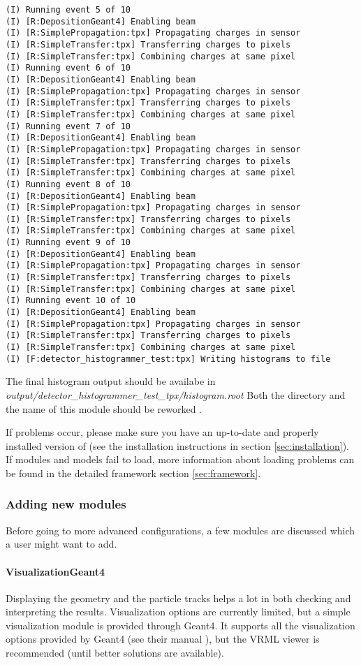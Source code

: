 \begin{lstlisting}[breaklines]
(I) Running event 5 of 10
(I) [R:DepositionGeant4] Enabling beam
(I) [R:SimplePropagation:tpx] Propagating charges in sensor
(I) [R:SimpleTransfer:tpx] Transferring charges to pixels
(I) [R:SimpleTransfer:tpx] Combining charges at same pixel
(I) Running event 6 of 10
(I) [R:DepositionGeant4] Enabling beam
(I) [R:SimplePropagation:tpx] Propagating charges in sensor
(I) [R:SimpleTransfer:tpx] Transferring charges to pixels
(I) [R:SimpleTransfer:tpx] Combining charges at same pixel
(I) Running event 7 of 10
(I) [R:DepositionGeant4] Enabling beam
(I) [R:SimplePropagation:tpx] Propagating charges in sensor
(I) [R:SimpleTransfer:tpx] Transferring charges to pixels
(I) [R:SimpleTransfer:tpx] Combining charges at same pixel
(I) Running event 8 of 10
(I) [R:DepositionGeant4] Enabling beam
(I) [R:SimplePropagation:tpx] Propagating charges in sensor
(I) [R:SimpleTransfer:tpx] Transferring charges to pixels
(I) [R:SimpleTransfer:tpx] Combining charges at same pixel
(I) Running event 9 of 10
(I) [R:DepositionGeant4] Enabling beam
(I) [R:SimplePropagation:tpx] Propagating charges in sensor
(I) [R:SimpleTransfer:tpx] Transferring charges to pixels
(I) [R:SimpleTransfer:tpx] Combining charges at same pixel
(I) Running event 10 of 10
(I) [R:DepositionGeant4] Enabling beam
(I) [R:SimplePropagation:tpx] Propagating charges in sensor
(I) [R:SimpleTransfer:tpx] Transferring charges to pixels
(I) [R:SimpleTransfer:tpx] Combining charges at same pixel
(I) [F:detector_histogrammer_test:tpx] Writing histograms to file
\end{lstlisting}
The final histogram output should be availabe in \\ \textit{output/detector\_histogrammer\_test\_tpx/histogram.root} \todo Both the directory and the name of this module should be reworked \todo.

If problems occur, please make sure you have an up-to-date and properly installed version of \apsq (see the installation instructions in section \ref{sec:installation}). If modules and models fail to load, more information about loading problems can be found in the detailed framework section \ref{sec:framework}.

\subsubsection{Adding new modules}
Before going to more advanced configurations, a few modules are discussed which a user might want to add.

\paragraph{VisualizationGeant4}
Displaying the geometry and the particle tracks helps a lot in both checking and interpreting the results. Visualization options are currently limited, but a simple visualization module is provided through Geant4. It supports all the visualization options provided by Geant4 (see their manual \needcite), but the VRML viewer is recommended (until better solutions are available). 

